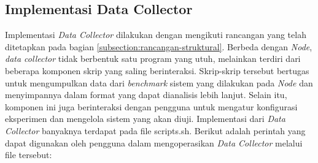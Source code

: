 \subsection{Implementasi Data Collector}
\label{subsection:implementasi-data-collector}

Implementasi \textit{Data Collector} dilakukan dengan mengikuti rancangan yang telah ditetapkan pada bagian \ref{subsection:rancangan-struktural}. Berbeda dengan \textit{Node}, \textit{data collector} tidak berbentuk satu program yang utuh, melainkan terdiri dari beberapa komponen skrip yang saling berinteraksi. Skrip-skrip tersebut bertugas untuk mengumpulkan data dari \textit{benchmark} sistem yang dilakukan pada \textit{Node} dan menyimpannya dalam format yang dapat dianalisis lebih lanjut. Selain itu, komponen ini juga berinteraksi dengan pengguna untuk mengatur konfigurasi eksperimen dan mengelola sistem yang akan diuji. Implementasi dari \textit{Data Collector} banyaknya terdapat pada file scripts.sh. Berikut adalah perintah yang dapat digunakan oleh pengguna dalam mengoperasikan \textit{Data Collector} melalui file tersebut:

